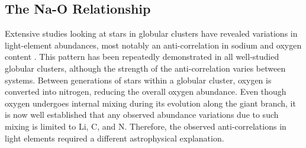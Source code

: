 \documentclass{emulateapj}
\begin{document}





\subsection{The Na-O Relationship}


Extensive studies looking at stars in globular clusters have revealed variations in light-element abundances, most notably an anti-correlation in sodium and oxygen content \citet[][and references therein]{norris;da_costa_1995,carretta;et-al_2009_na_o}. This pattern has been repeatedly demonstrated in all well-studied globular clusters, although the strength of the anti-correlation varies between systems. Between generations of stars within a globular cluster, oxygen is converted into nitrogen, reducing the overall oxygen abundance. Even though oxygen undergoes internal mixing during its evolution along the giant branch, it is now well established that any observed abundance variations due to such mixing is limited to Li, C, and N. Therefore, the observed anti-correlations in light elements required a different astrophysical explanation.

\end{document}
